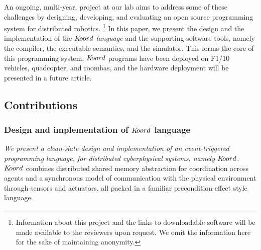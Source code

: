 An ongoing, multi-year, project at our lab aims to address some of these challenges by designing, developing, and evaluating an open source programming system for distributed robotics. \footnote{Information about this project and the links to downloadable software will be made available to the reviewers upon request. We omit the information here for the sake of maintaining anonymity.} In this paper, we present the design and the implementation of the  {\em $K\kern-2pt oord$ language} and the supporting software tools, namely the compiler, the \K executable semantics, and the simulator. This forms the  core of this programming system. $K\kern-2pt oord$ programs have been deployed on F1/10 vehicles, quadcopter, and roombas, and the hardware deployment will be presented in a future article. 





%
%
\subsection{Contributions}
\subsubsection{Design and implementation of $K\kern-2pt oord$ language}
{\em We present a clean-slate design and implementation of an event-triggered programming language, for distributed cyberphysical systems, namely $K\kern-2pt oord$.} 
%
$K\kern-2pt oord$ combines distributed shared memory abstraction for coordination across agents and a synchronous model of communication with the physical environment through sensors and actuators, all packed in a familiar precondition-effect style language.
%

